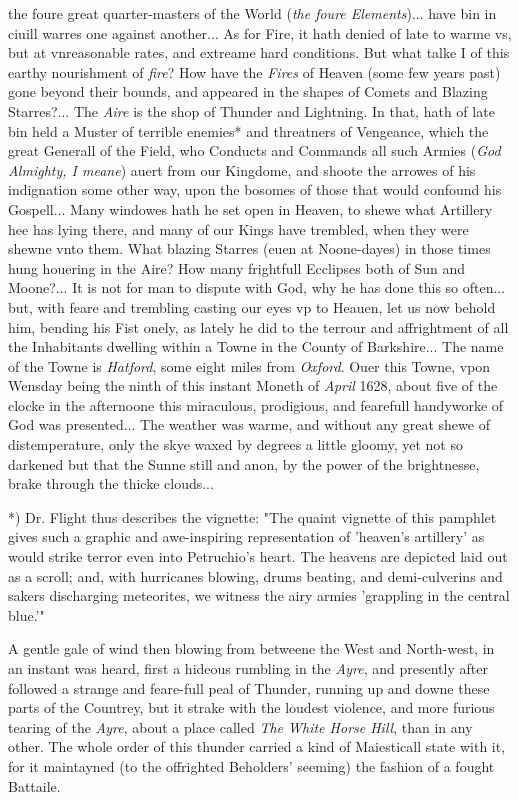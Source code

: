 \documentclass[a4paper, 12pt, oneside, polutonikogreek, english]{article}
\begin{document}
the foure great quarter-masters of the World (\emph{the foure Elements})... have bin in ciuill warres one against another... As for Fire, it hath denied of late to warme vs, but at vnreasonable rates, and extreame hard conditions. But what talke I of this earthy nourishment of \emph{fire}? How have the \emph{Fires} of Heaven (some few years past) gone beyond their bounds, and appeared in the shapes of Comets and Blazing Starres?... The \emph{Aire} is the shop of Thunder and Lightning. In that, hath of late bin held a Muster of terrible enemies* and threatners of Vengeance, which the great Generall of the Field, who Conducts and Commands all such Armies (\emph{God Almighty, I meane}) auert from our Kingdome, and shoote the arrowes of his indignation some other way, upon the bosomes of those that would confound his Gospell... Many windowes hath he set open in Heaven, to shewe what Artillery hee has lying there, and many of our Kings have trembled, when they were shewne vnto them. What blazing Starres (euen at Noone-dayes) in those times hung houering in the Aire? How many frightfull Ecclipses both of Sun and Moone?... It is not for man to dispute with God, why he has done this so often... but, with feare and trembling casting our eyes vp to Heauen, let us now behold him, bending his Fist onely, as lately he did to the terrour and affrightment of all the Inhabitants dwelling within a Towne in the County of Barkshire... The name of the Towne is \emph{Hatford}, some eight miles from \emph{Oxford}. Ouer this Towne, vpon Wensday being the ninth of this instant Moneth of \emph{April} 1628, about five of the clocke in the afternoone this miraculous, prodigious, and fearefull handyworke of God was presented... The weather was warme, and without any great shewe of distemperature, only the skye waxed by degrees a little gloomy, yet not so darkened but that the Sunne still and anon, by the power of the brightnesse, brake through the thicke clouds...

*) Dr. Flight thus describes the vignette: "The quaint vignette of this pamphlet gives such a graphic and awe-inspiring representation of 'heaven's artillery' as would strike terror even into Petruchio's heart. The heavens are depicted laid out as a scroll; and, with hurricanes blowing, drums beating, and demi-culverins and sakers discharging meteorites, we witness the airy armies 'grappling in the central blue.'"

A gentle gale of wind then blowing from betweene the West and North-west, in an instant was heard, first a hideous rumbling in the \emph{Ayre}, and presently after followed a strange and feare-full peal of Thunder, running up and downe these parts of the Countrey, but it strake with the loudest violence, and more furious tearing of the \emph{Ayre}, about a place called \emph{The White Horse Hill}, than in any other. The whole order of this thunder carried a kind of Maiesticall state with it, for it maintayned (to the offrighted Beholders' seeming) the fashion of a fought Battaile.
\end{document}
